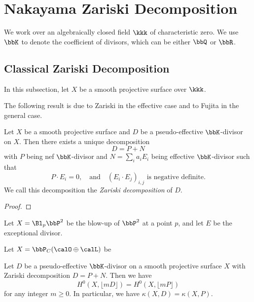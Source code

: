 \section{Nakayama Zariski Decomposition}

  We work over an algebraically closed field $\kkk$ of characteristic zero. 
  We use $\bbK$ to denote the coefficient of divisors, which can be either $\bbQ$ or $\bbR$.


\subsection{Classical Zariski Decomposition}

  In this subsection, let $X$ be a smooth projective surface over $\kkk$.

  The following result is due to Zariski in the effective case and to Fujita in the general case.

  \begin{theorem}
    Let $X$ be a smooth projective surface and $D$ be a pseudo-effective $\bbK$-divisor on $X$. 
    Then there exists a unique decomposition
    \[ D = P + N \]
    with $P$ being nef $\bbK$-divisor and $N = \sum_i a_i E_i$ being effective $\bbK$-divisor 
    such that 
    \[ P \cdot E_i = 0, \quad \text{and} \quad (E_i \cdot E_j)_{i,j} \text{ is negative definite}. \]
    We call this decomposition the \emph{Zariski decomposition} of $D$.
  \end{theorem}
  \begin{proof}
    \Yang{}
  \end{proof}

  \begin{example}
    Let $X = \Bl_p \bbP^2$ be the blow-up of $\bbP^2$ at a point $p$, and let $E$ be the exceptional divisor.
      \Yang{}
  \end{example}

  \begin{example}
    Let $X = \bbP_C(\calO \oplus \calL)$ be 
    \Yang{}
  \end{example}

  \begin{proposition}
    Let $D$ be a pseudo-effective $\bbK$-divisor on a smooth projective surface $X$ with Zariski decomposition $D = P + N$. Then we have
    \[ H^0(X, \lfloor mD \rfloor) = H^0(X, \lfloor mP \rfloor) \]
    for any integer $m \geq 0$. In particular, we have $\kappa(X, D) = \kappa(X, P)$.
   \Yang{}
  \end{proposition}

